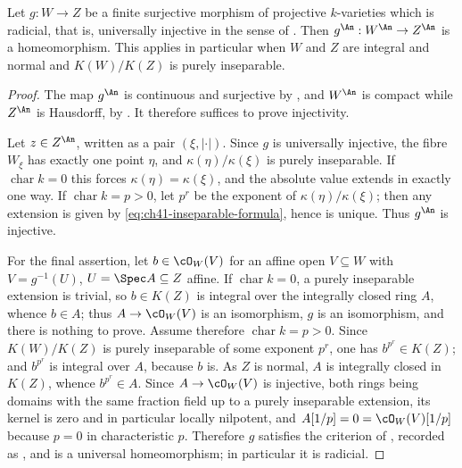 \begin{lemma}
\label{lem:ch41-radicial-homeo}
Let $g:W\to Z$ be a finite surjective morphism of projective
$k$-varieties which is radicial, that is, universally injective in the
sense of .  Then
$g^{\An}:W^{\An}\to Z^{\An}$ is a homeomorphism.  This applies in
particular when $W$ and $Z$ are integral and normal and
$K(W)/K(Z)$ is purely inseparable.
\end{lemma}

\begin{proof}
The map $g^{\An}$ is continuous and surjective by
, and $W^{\An}$ is compact while
$Z^{\An}$ is Hausdorff, by .  It
therefore suffices to prove injectivity.

Let $z\in Z^{\An}$, written as a pair $(\xi,|\cdot|)$.  Since $g$ is
universally injective, the fibre $W_\xi$ has exactly one point $\eta$,
and $\kappa(\eta)/\kappa(\xi)$ is purely inseparable.  If
$\operatorname{char}k=0$ this forces $\kappa(\eta)=\kappa(\xi)$, and the
absolute value extends in exactly one way.  If
$\operatorname{char}k=p>0$, let $p^r$ be the exponent of
$\kappa(\eta)/\kappa(\xi)$; then any extension is given by
\eqref{eq:ch41-inseparable-formula}, hence is unique.  Thus $g^{\An}$ is
injective.

For the final assertion, let $b\in\cO_W(V)$ for an affine open
$V\subseteq W$ with $V=g^{-1}(U)$, $U=\Spec A\subseteq Z$ affine.
If $\operatorname{char}k=0$, a purely inseparable extension is trivial, so
$b\in K(Z)$ is integral over the integrally closed ring $A$, whence
$b\in A$; thus $A\to\cO_W(V)$ is an isomorphism, $g$ is an
isomorphism, and there is nothing to prove.  Assume therefore
$\operatorname{char}k=p>0$.
Since $K(W)/K(Z)$ is purely inseparable of some exponent $p^r$, one has
$b^{p^r}\in K(Z)$; and $b^{p^r}$ is integral over $A$, because $b$
is.  As $Z$ is normal, $A$ is integrally closed in $K(Z)$, whence
$b^{p^r}\in A$.  Since $A\to\cO_W(V)$ is injective, both rings being
domains with the same fraction field up to a purely inseparable extension,
its kernel is zero and in particular locally nilpotent, and
$A[1/p]=0=\cO_W(V)[1/p]$ because $p=0$ in characteristic $p$.
Therefore $g$ satisfies the criterion of
\cite[\href{https://stacks.math.columbia.edu/tag/0CNF}{Tag 0CNF}]
{stacks-project}, recorded as
, and is a universal
homeomorphism; in particular it is radicial.
\end{proof}

